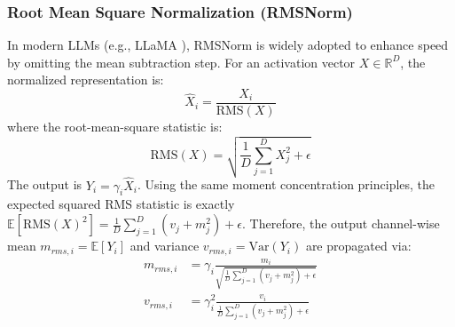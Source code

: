 \documentclass{article}
\theoremstyle{plain}
\theoremstyle{definition}
\theoremstyle{remark}
\begin{document}
\subsubsection{Root Mean Square Normalization (RMSNorm)}
In modern LLMs (e.g., LLaMA \cite{touvron2023llama}), RMSNorm is widely adopted to enhance speed by omitting the mean subtraction step. For an activation vector $X \in \mathbb{R}^D$, the normalized representation is:
\begin{equation}
    \hat{X}_i = \frac{X_i}{\text{RMS}(X)}
\end{equation}
where the root-mean-square statistic is:
\begin{equation}
    \text{RMS}(X) = \sqrt{\frac{1}{D} \sum_{j=1}^D X_j^2 + \epsilon}
\end{equation}
The output is $Y_i = \gamma_i \hat{X}_i$. Using the same moment concentration principles, the expected squared RMS statistic is exactly $\mathbb{E}[\text{RMS}(X)^2] = \frac{1}{D} \sum_{j=1}^D (v_j + m_j^2) + \epsilon$. Therefore, the output channel-wise mean $m_{rms, i} = \mathbb{E}[Y_i]$ and variance $v_{rms, i} = \text{Var}(Y_i)$ are propagated via:
\begin{align}
    m_{rms, i} &= \gamma_i \frac{m_i}{\sqrt{\frac{1}{D} \sum_{j=1}^D (v_j + m_j^2) + \epsilon}} \\
    v_{rms, i} &= \gamma_i^2 \frac{v_i}{\frac{1}{D} \sum_{j=1}^D (v_j + m_j^2) + \epsilon}
\end{align}
\end{document}
